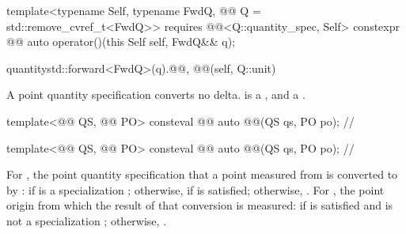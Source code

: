 \begin{itemdecl}
template<typename Self, typename FwdQ, @@ Q = std::remove_cvref_t<FwdQ>>
  requires @@<Q::quantity_spec, Self{}>
constexpr @@ auto operator()(this Self self, FwdQ&& q);
\end{itemdecl}

\begin{itemdescr}
\pnum
\returns
\begin{codeblock}
quantity{std::forward<FwdQ>(q).@@, @@(self, Q::unit)}
\end{codeblock}
\begin{note}
A point quantity specification converts no delta.
 is a
,
and  a .
\end{note}
\end{itemdescr}

\begin{itemdecl}
template<@@ QS, @@ PO>
consteval @@ auto @@(QS qs, PO po);      // \expos

template<@@ QS, @@ PO>
consteval @@ auto @@(QS qs, PO po);      // \expos
\end{itemdecl}

\begin{itemdescr}
\pnum
\returns
For , the point quantity specification
that a point measured from  is converted to by :
 if  is a specialization ;
otherwise, 
if  is satisfied;
otherwise, .
For , the point origin from which the result of that conversion is measured:
 if  is satisfied and
 is not a specialization ;
otherwise, .
\end{itemdescr}

